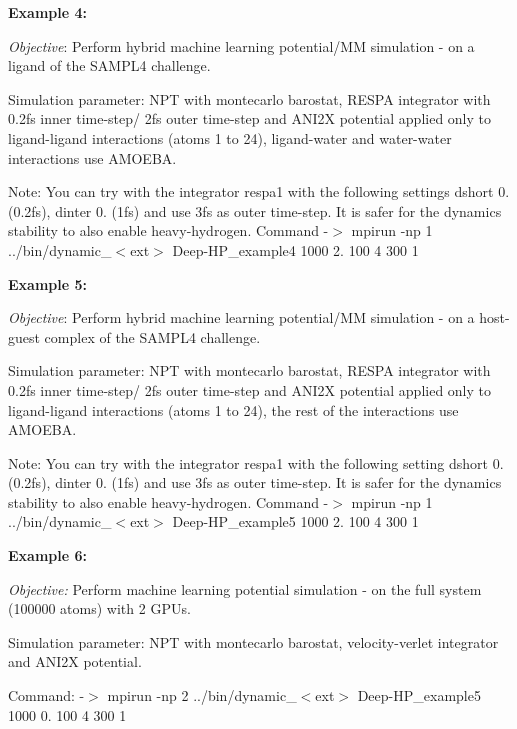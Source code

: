 \begin{DoxyItemize}
\item {\bfseries Example 4\-:}\par
 {\itshape Objective}\-: Perform hybrid machine learning potential/\-M\-M simulation -\/ on a ligand of the S\-A\-M\-P\-L4 challenge.\par
 Simulation parameter\-: N\-P\-T with montecarlo barostat, R\-E\-S\-P\-A integrator with 0.\-2fs inner time-\/step/ 2fs outer time-\/step and A\-N\-I2\-X potential applied only to ligand-\/ligand interactions (atoms 1 to 24), ligand-\/water and water-\/water interactions use A\-M\-O\-E\-B\-A.\par
 Note\-: You can try with the {\ttfamily integrator respa1} with the following settings {\ttfamily dshort 0.} (0.\-2fs), {\ttfamily dinter 0.} (1fs) and use 3fs as outer time-\/step. It is safer for the dynamics stability to also enable {\ttfamily heavy-\/hydrogen}. Command -\/$>$ {\ttfamily mpirun -\/np 1 ../bin/dynamic\-\_\-$<$ext$>$ Deep-\/\-H\-P\-\_\-example4 1000 2. 100 4 300 1}\par

\item {\bfseries Example 5\-:}\par
 {\itshape Objective}\-: Perform hybrid machine learning potential/\-M\-M simulation -\/ on a host-\/guest complex of the S\-A\-M\-P\-L4 challenge.\par
 Simulation parameter\-: N\-P\-T with montecarlo barostat, R\-E\-S\-P\-A integrator with 0.\-2fs inner time-\/step/ 2fs outer time-\/step and A\-N\-I2\-X potential applied only to ligand-\/ligand interactions (atoms 1 to 24), the rest of the interactions use A\-M\-O\-E\-B\-A.\par
 Note\-: You can try with the {\ttfamily integrator respa1} with the following setting {\ttfamily dshort 0.} (0.\-2fs), {\ttfamily dinter 0.} (1fs) and use 3fs as outer time-\/step. It is safer for the dynamics stability to also enable {\ttfamily heavy-\/hydrogen}. Command -\/$>$ {\ttfamily mpirun -\/np 1 ../bin/dynamic\-\_\-$<$ext$>$ Deep-\/\-H\-P\-\_\-example5 1000 2. 100 4 300 1}\par

\item {\bfseries Example 6\-:}\par
 {\itshape Objective\-:} Perform machine learning potential simulation -\/ on the full system (100000 atoms) with 2 G\-P\-Us.\par
 Simulation parameter\-: N\-P\-T with montecarlo barostat, velocity-\/verlet integrator and A\-N\-I2\-X potential.\par
 Command\-: -\/$>$ {\ttfamily mpirun -\/np 2 ../bin/dynamic\-\_\-$<$ext$>$ Deep-\/\-H\-P\-\_\-example5 1000 0. 100 4 300 1}\par

\end{DoxyItemize}

